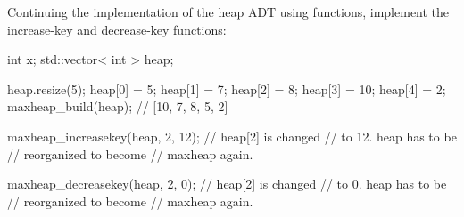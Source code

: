 Continuing the implementation of the heap ADT using functions,
implement the increase-key and decrease-key
functions:
\begin{console}
int x;
std::vector< int > heap;

heap.resize(5);
heap[0] = 5;
heap[1] = 7;
heap[2] = 8;
heap[3] = 10;
heap[4] = 2;
maxheap_build(heap);      // [10, 7, 8, 5, 2]

maxheap_increasekey(heap, 2, 12); // heap[2] is changed
                          // to 12. heap has to be
                          // reorganized to become
                          // maxheap again.
                          
maxheap_decreasekey(heap, 2, 0); // heap[2] is changed
                          // to 0. heap has to be
                          // reorganized to become
                          // maxheap again.
\end{console}
